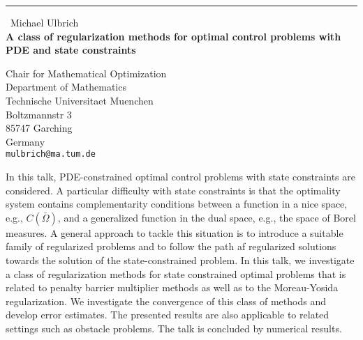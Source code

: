 \documentclass{report}
\begin{document}
\begin{center}
\rule{6in}{1pt} \
{\large Michael Ulbrich \\
{\bf A class of regularization methods for optimal control problems with PDE and state constraints }}

Chair for Mathematical Optimization \\ Department of Mathematics \\ Technische Universitaet Muenchen \\ Boltzmannstr 3 \\ 85747 Garching \\ Germany
\\
{\tt mulbrich@ma.tum.de}\end{center}

In this talk, PDE-constrained optimal control problems with state
constraints are considered. A particular difficulty with state
constraints is that the optimality system contains complementarity
conditions between a function in a nice space, e.g., $C(\bar\Omega)$, and
a generalized function in the dual space, e.g., the space of Borel
measures.
A general approach to tackle this situation is to introduce a suitable
family of regularized problems and to follow the path af regularized
solutions towards the solution of the state-constrained problem.
In this talk, we investigate a class of regularization methods for state
constrained optimal problems that is related to penalty barrier
multiplier methods as well as to the Moreau-Yosida regularization.
We investigate the convergence of this class of methods and develop error
estimates. The presented results are also applicable to related settings
such as obstacle problems. The talk is concluded by numerical results.
\end{document}
